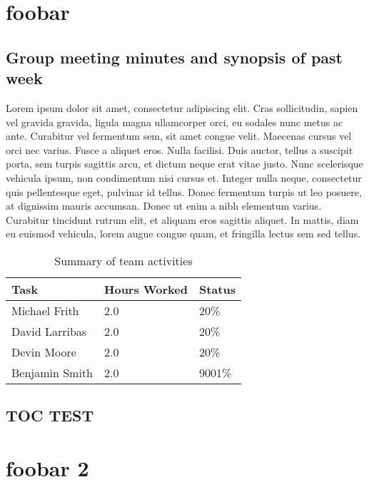 \documentclass[12pt,article]{IEEEtran}
\begin{document}

	 
\section{foobar}
	\subsection{Group meeting minutes and synopsis of past week}
	
	Lorem ipsum dolor sit amet, consectetur adipiscing elit. Cras sollicitudin, sapien vel gravida gravida, ligula magna ullamcorper orci, eu sodales nunc metus ac ante. Curabitur vel fermentum sem, sit amet congue velit. Maecenas cursus vel orci nec varius. Fusce a aliquet eros. Nulla facilisi. Duis auctor, tellus a suscipit porta, sem turpis sagittis arcu, et dictum neque erat vitae justo. Nunc scelerisque vehicula ipsum, non condimentum nisi cursus et. Integer nulla neque, consectetur quis pellentesque eget, pulvinar id tellus. Donec fermentum turpis ut leo posuere, at dignissim mauris accumsan. Donec ut enim a nibh elementum varius. Curabitur tincidunt rutrum elit, et aliquam eros sagittis aliquet. In mattis, diam eu euismod vehicula, lorem augue congue quam, et fringilla lectus sem sed tellus.
	
	\begin{table}[ht]
		\renewcommand{\arraystretch}{1.3}
		\caption{Summary of team activities}
		
		\label{Summary of team activities}
		
		\centering
		\begin{tabular}{p{5.5cm}|p{1cm}|p{1cm}}
		\hline
		\bfseries 	Task		 		& \bfseries Hours Worked	& \bfseries Status	\\
		\hline
		\hline
					Michael Frith		& 2.0						& 20\%				\\	%
					David Larribas 		& 2.0						& 20\%				\\	
					Devin Moore 		& 2.0						& 20\%				\\	
					Benjamin Smith		& 2.0						& 9001\%			\\	
		\hline
		\end{tabular}
		
		\subsection{TOC TEST}
		
	\end{table}

\section{foobar 2}
\end{document}
